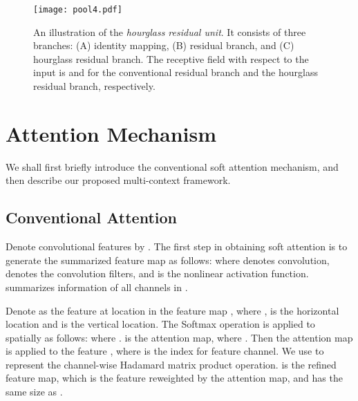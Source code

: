 \documentclass[10pt,twocolumn,letterpaper]{article}
\begin{document}
\begin{figure}[t]
\begin{center}
   \texttt{[image: pool4.pdf]}
\end{center}
  \vspace{-1.5em}
   \caption{\small An illustration of the \textit{hourglass residual unit}. It consists of three branches: (A) identity mapping, (B) residual branch, and (C) hourglass residual branch. The receptive field with respect to the input is  and  for the conventional residual branch and the hourglass residual branch, respectively.}
\label{fig: nested hourglass}
  \vspace{-1em}
\end{figure}




\section{Attention Mechanism}

We shall first briefly introduce the conventional soft attention mechanism, and then describe our proposed multi-context framework. 

\subsection{Conventional Attention}
Denote convolutional features by .
The first step in obtaining soft attention is to generate the summarized feature map as follows:
{\small \vspace{-0.8em}
}
\!\!where  denotes convolution,  denotes the convolution filters, and  is the nonlinear activation function.  summarizes information of all channels in .

Denote  as the feature at location  in the feature map , where ,  is the horizontal location and  is the vertical location. The Softmax operation is applied to  spatially as follows:
{\small \vspace{-0.8em}
}
\!\!where .  is the attention map, where .
Then the attention map is applied to the feature ,
{\small \vspace{-1em}
 }
\!\!where  is the index for feature channel. We use  to represent the channel-wise Hadamard matrix product operation. 
 is the refined feature map, which is the feature reweighted by the attention map, and has the same size as .
\end{document}
